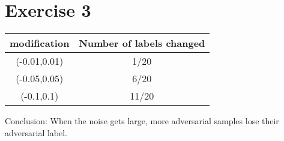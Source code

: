 
\section*{Exercise 3}

\begin{center}
\begin{tabular}{|c|c|} 
 \hline
modification & Number of labels changed  \\ 
\hline
(-0.01,0.01) & 1/20 \\ 
(-0.05,0.05) & 6/20 \\ 
(-0.1,0.1) & 11/20 \\
 \hline
\end{tabular}
\end{center}


Conclusion: When the noise gets large, more adversarial samples lose their adversarial label.